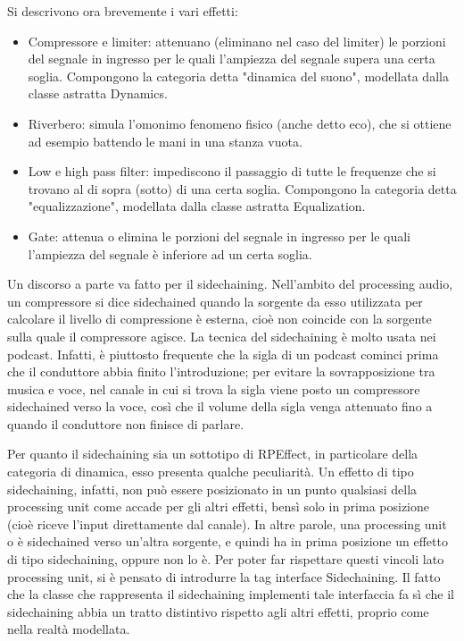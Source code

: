 \documentclass[a4paper,12pt]{report}
\begin{document}
Si descrivono ora brevemente i vari effetti:
\begin{itemize}
    \item Compressore e limiter: attenuano (eliminano nel caso del limiter) le porzioni del segnale in ingresso per le quali l’ampiezza del segnale supera una certa soglia. Compongono la categoria detta "dinamica del suono", modellata dalla classe astratta Dynamics.
    \item Riverbero: simula l’omonimo fenomeno fisico (anche detto eco), che si ottiene ad esempio battendo le mani in una stanza vuota.
    \item Low e high pass filter: impediscono il passaggio di tutte le frequenze che si trovano al di sopra (sotto) di una certa soglia. Compongono la categoria detta "equalizzazione", modellata dalla classe astratta Equalization.
    \item Gate: attenua o elimina le porzioni del segnale in ingresso per le quali l’ampiezza del segnale è inferiore ad un certa soglia.
\end{itemize}
Un discorso a parte va fatto per il sidechaining. Nell’ambito del processing audio, un compressore si dice sidechained quando la sorgente da esso utilizzata per calcolare il livello di compressione è esterna, cioè non coincide con la sorgente sulla quale il compressore agisce. La tecnica del sidechaining è molto usata nei podcast. Infatti, è piuttosto frequente che la sigla di un podcast cominci prima che il conduttore abbia finito l’introduzione; per evitare la sovrapposizione tra musica e voce, nel canale in cui si trova la sigla viene posto un compressore sidechained verso la voce, così che il volume della sigla venga attenuato fino a quando il conduttore non finisce di parlare. 

Per quanto il sidechaining sia un sottotipo di RPEffect, in particolare della categoria di dinamica, esso presenta qualche peculiarità. Un effetto di tipo sidechaining, infatti, non può essere posizionato in un punto qualsiasi della processing unit come accade per gli altri effetti, bensì solo in prima posizione (cioè riceve l’input direttamente dal canale). In altre parole, una processing unit o è sidechained verso un’altra sorgente, e quindi ha in prima posizione un effetto di tipo sidechaining, oppure non lo è. Per poter far rispettare questi vincoli lato processing unit, si è pensato di introdurre la tag interface Sidechaining. Il fatto che la classe che rappresenta il sidechaining implementi tale interfaccia fa sì che il sidechaining abbia un tratto distintivo rispetto agli altri effetti, proprio come nella realtà modellata.
\end{document}
